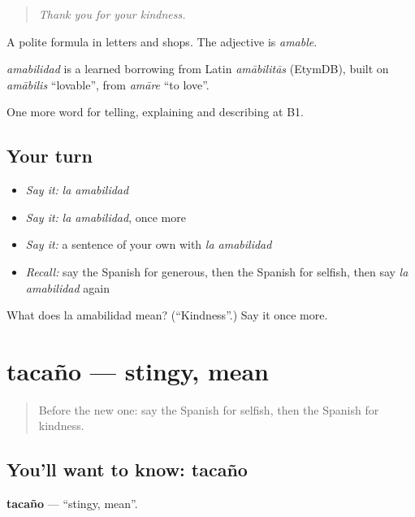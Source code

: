 \begin{quote}
\emph{Thank you for your kindness.}
\end{quote}

A polite formula in letters and shops. The adjective is \emph{amable}.

\begin{cousinweb}
\emph{amabilidad} is a learned borrowing from Latin \emph{amābilitās} (EtymDB), built on \emph{amābilis} \textquotedblleft{}lovable\textquotedblright{}, from \emph{amāre} \textquotedblleft{}to love\textquotedblright{}.
\end{cousinweb}

\begin{grammarlens}[title={What you've built}]
One more word for telling, explaining and describing at B1.
\end{grammarlens}

\subsection*{Your turn}
\begin{itemize}
\raggedright
  \item \emph{Say it:} \emph{la amabilidad}
  \item \emph{Say it:} \emph{la amabilidad}, once more
  \item \emph{Say it:} a sentence of your own with \emph{la amabilidad}
  \item \emph{Recall:} say the Spanish for generous, then the Spanish for selfish, then say \emph{la amabilidad} again
\end{itemize}

\begin{tcolorbox}[breakable,colback=teal!4,colframe=teal!35!black,title={Before you move on}]
What does la amabilidad mean? (\textquotedblleft{}Kindness\textquotedblright{}.) Say it once more.
\end{tcolorbox}
\section[tacaño]{tacaño — stingy, mean}

\label{lesson:ES-C723-tacano}



\begin{quote}
Before the new one: say the Spanish for selfish, then the Spanish for kindness.
\end{quote}

\subsection*{You'll want to know: tacaño}
\textbf{tacaño} — \textquotedblleft{}stingy, mean\textquotedblright{}.


